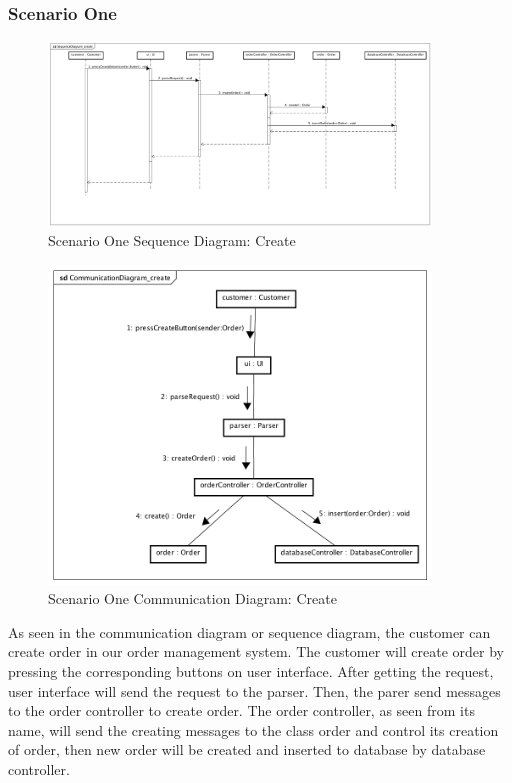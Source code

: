 \documentclass[12pt]{scrreprt}
\begin{document}
\subsubsection{Scenario One}
\begin{figure}[H]
  \centering\includegraphics[width=4in]{DocumentRes/1SequenceDiagram_create.png}
  \caption{Scenario One Sequence Diagram: Create}
\end{figure}
\begin{figure}[H]
  \centering\includegraphics[width=4in]{DocumentRes/1CommunicationDiagram_create.png}
  \caption{Scenario One Communication Diagram: Create}
\end{figure}
As seen in the communication diagram or sequence diagram, the customer can
create order in our order management system. The customer will create order by
pressing the corresponding buttons on user interface. After getting the request,
user interface will send the request to the parser. Then, the parer send messages
to the order controller to create order. The order controller, as seen from its
name, will send the creating messages to the class order and control its
creation of order, then new order will be created and inserted to database by
database controller.
\end{document}
